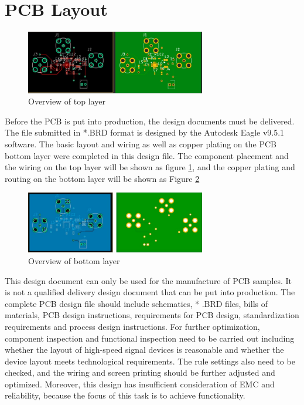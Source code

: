 \documentclass[12pt, a4paper]{report}
\begin{document}
\section{PCB Layout}


\begin{figure}[htbp]     \begin{centering}
    \includegraphics[width=0.7\textwidth]{img/F1.jpg}
    \caption{\label{Fig:e2} Overview of top layer}
    \end{centering}
\end{figure}

Before the PCB is put into production, the design documents must be delivered. The file submitted in *.BRD format is designed by the Autodesk Eagle v9.5.1 software. The basic layout and wiring as well as copper plating on the PCB bottom layer were completed in this design file. The component placement and the wiring on the top layer will be shown as figure \ref{Fig:e2}, and the copper plating and routing on the bottom layer will be shown as Figure \ref{Fig:e3}


\begin{figure}[htbp]     \begin{centering}
    \includegraphics[width=0.7\textwidth]{img/F0.jpg}
    \caption{\label{Fig:e3} Overview of bottom layer}
    \end{centering}
\end{figure}


This design document can only be used for the manufacture of PCB samples. It is not a qualified delivery design document that can be put into production. The complete PCB design file should include schematics, * .BRD files, bills of materials, PCB design instructions, requirements for PCB design, standardization requirements and process design instructions. For further optimization, component inspection and functional inspection need to be carried out including whether the layout of high-speed signal devices is reasonable and whether the device layout meets technological requirements. The rule settings also need to be checked, and the wiring and screen printing should be further adjusted and optimized. Moreover, this design has insufficient consideration of EMC and reliability, because the focus of this task is to achieve functionality.
\end{document}
